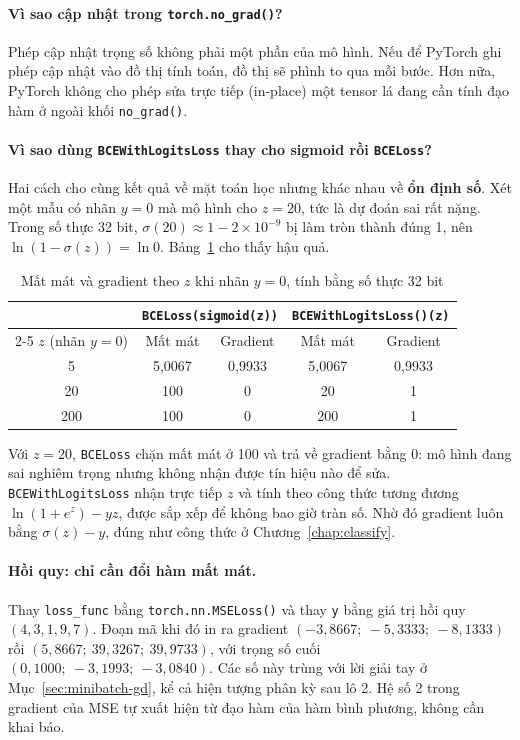 \paragraph{Vì sao cập nhật trong \texttt{torch.no\_grad()}?} Phép cập nhật trọng số không phải một phần của mô hình. Nếu để PyTorch ghi phép cập nhật vào đồ thị tính toán, đồ thị sẽ phình to qua mỗi bước. Hơn nữa, PyTorch không cho phép sửa trực tiếp (in-place) một tensor lá đang cần tính đạo hàm ở ngoài khối \texttt{no\_grad()}.

\paragraph{Vì sao dùng \texttt{BCEWithLogitsLoss} thay cho sigmoid rồi \texttt{BCELoss}?} Hai cách cho cùng kết quả về mặt toán học nhưng khác nhau về \textbf{ổn định số}. Xét một mẫu có nhãn $y = 0$ mà mô hình cho $z = 20$, tức là dự đoán sai rất nặng. Trong số thực 32 bit, $\sigma(20) \approx 1 - 2 \times 10^{-9}$ bị làm tròn thành đúng 1, nên $\ln(1 - \sigma(z)) = \ln 0$. Bảng~\ref{tab:bce-stability} cho thấy hậu quả.

\begin{table}[H]
\centering
\begin{tabular}{|c|c|c|c|c|}
\hline
 & \multicolumn{2}{c|}{\texttt{BCELoss(sigmoid(z))}} & \multicolumn{2}{c|}{\texttt{BCEWithLogitsLoss()(z)}} \\
\cline{2-5}
$z$ (nhãn $y = 0$) & Mất mát & Gradient & Mất mát & Gradient \\
\hline
5 & 5,0067 & 0,9933 & 5,0067 & 0,9933 \\ \hline
20 & 100 & 0 & 20 & 1 \\ \hline
200 & 100 & 0 & 200 & 1 \\ \hline
\end{tabular}
\caption{Mất mát và gradient theo $z$ khi nhãn $y = 0$, tính bằng số thực 32 bit}
\label{tab:bce-stability}
\end{table}

Với $z = 20$, \texttt{BCELoss} chặn mất mát ở 100 và trả về gradient bằng 0: mô hình đang sai nghiêm trọng nhưng không nhận được tín hiệu nào để sửa. \texttt{BCEWithLogitsLoss} nhận trực tiếp $z$ và tính theo công thức tương đương $\ln(1 + e^{z}) - yz$, được sắp xếp để không bao giờ tràn số. Nhờ đó gradient luôn bằng $\sigma(z) - y$, đúng như công thức ở Chương~\ref{chap:classify}.

\paragraph{Hồi quy: chỉ cần đổi hàm mất mát.} Thay \texttt{loss\_func} bằng \texttt{torch.nn.MSELoss()} và thay \texttt{y} bằng giá trị hồi quy $(4, 3, 1, 9, 7)$. Đoạn mã khi đó in ra gradient $(-3{,}8667;\ -5{,}3333;\ -8{,}1333)$ rồi $(5{,}8667;\ 39{,}3267;\ 39{,}9733)$, với trọng số cuối $(0{,}1000;\ -3{,}1993;\ -3{,}0840)$. Các số này trùng với lời giải tay ở Mục~\ref{sec:minibatch-gd}, kể cả hiện tượng phân kỳ sau lô 2. Hệ số 2 trong gradient của MSE tự xuất hiện từ đạo hàm của hàm bình phương, không cần khai báo.

